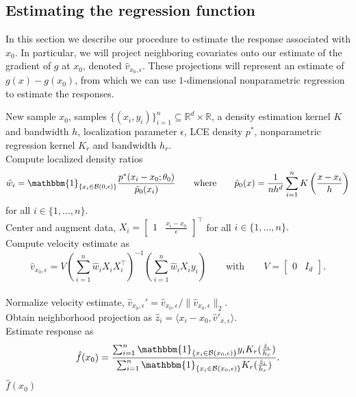 \documentclass[11pt]{article}
\begin{document}
\subsection{Estimating the regression function} \label{sec: regression est}

In this section we describe our procedure to estimate the response associated with $x_0$. In particular, we will project neighboring covariates onto our estimate of the gradient of $g$ at $x_0$, denoted $\hat v_{x_0, \epsilon}$. These projections will represent an estimate of $g(x) - g(x_0)$, from which we can use $1$-dimensional nonparametric regression to estimate the responses.

\begin{algorithm}[h]
    \begin{algorithmic}[1]
        \caption{Locally Linear Single Index Regression (LLSIR)}
        \label{alg: LLSIR}
        \Require New sample $x_0$, samples $\{(x_i, y_i)\}_{i=1}^n \subseteq \mathbb{R}^d \times \mathbb{R}$, a density estimation kernel $K$ and bandwidth $h$, localization parameter $\epsilon$, LCE density $p^*$, nonparametric regression kernel $K_r$ and bandwidth $h_r$.\\
        Compute localized density ratios \[\hat{w}_i = \mathbbm{1}_{\{x_i \in \mathcal{B}(0, \epsilon)\}}\frac{p^*(x_i - x_0; \theta_0)}{\hat p_0(x_i)} \qquad \text{where} \qquad \hat p_0(x) = \frac{1}{nh^d}\sum_{i = 1}^nK\left(\frac{x -x_i}{h}\right)\]for all $i \in \{1, \dots, n\}$. \\
        Center and augment data, $X_i = \begin{bmatrix}
            1 & \frac{x_i - x_0}{\epsilon}
        \end{bmatrix}^{\top}$ for all $i \in \{1, \dots , n\}.$ \\
        Compute velocity estimate as 
        \[ \hat{v}_{x_0, \epsilon} = V\left(\sum_{i = 1}^n\hat{w}_iX_iX_i^{\top}\right)^{-1}\left(\sum_{i = 1}^n\hat{w}_iX_iy_i\right) \qquad \text{with} \qquad V = \begin{bmatrix}
            0 & I_d
        \end{bmatrix}.\] \\
        Normalize velocity estimate, $\hat v_{x_0, \epsilon}' = \hat v_{x_0, \epsilon} /\|\hat v_{x_0, \epsilon}\|_2$.\\
        Obtain neighborhood projection as $\hat{z}_i = \langle x_i - x_0, \hat{v}'_{x, \epsilon} \rangle$. \\
        Estimate response as 
        \begin{equation} \label{eq: kernel regressor}
            \hat{f}(x_0) = \frac{\sum_{i=1}^n \mathbbm{1}_{\{x_i\in \mathcal{B}(x_0, \epsilon)\}}y_iK_r(\frac{\hat{z}_i}{h_r})}{\sum_{i=1}^n \mathbbm{1}_{\{x_i\in \mathcal{B}(x_0, \epsilon)\}}K_r(\frac{\hat{z}_i}{h_r})}.
        \end{equation}
        \Return $\hat{f}(x_0)$
    \end{algorithmic}
\end{algorithm}
\end{document}
